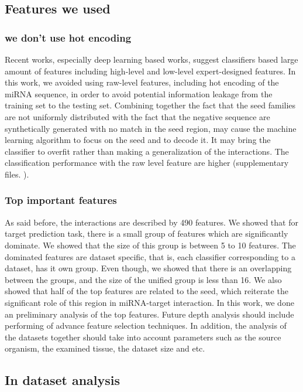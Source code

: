 \documentclass{bmcart}
\begin{document}
\subsection*{Features we used}
\subsubsection*{we don't use hot encoding}
Recent works, especially deep learning based works, suggest classifiers based large amount of features including high-level and low-level expert-designed features. In this work, we avoided using raw-level features, including hot encoding of the miRNA sequence, in order to avoid potential information leakage from the training set to the testing set. Combining together the fact that the seed families are not uniformly distributed with the fact that the negative sequence are synthetically generated with no match in the seed region, may cause the machine learning algorithm to focus on the seed and to decode it. It may bring the classifier to overfit rather than making a generalization of the interactions. The classification performance with the raw level feature are higher (supplementary files. ).

\subsubsection*{Top important features}
As said before, the interactions are described by 490 features. We showed that for target prediction task, there is a small group of features which are significantly dominate. We showed that the size of this group is between 5 to 10 features. The dominated features are dataset specific, that is, each classifier corresponding to a dataset, has it own group. Even though, we showed that there is an overlapping between the groups, and the size of the unified group is less than 16. We also showed that half of the top features are related to the seed, which reiterate the significant role of this region in miRNA-target interaction. 
In this work, we done an preliminary analysis of the top features. Future depth analysis should include performing of advance feature selection techniques. In addition, the analysis of the datasets together should take into account parameters such as the source organism, the examined tissue, the dataset size and etc. 

\subsection*{In dataset analysis}
\end{document}

